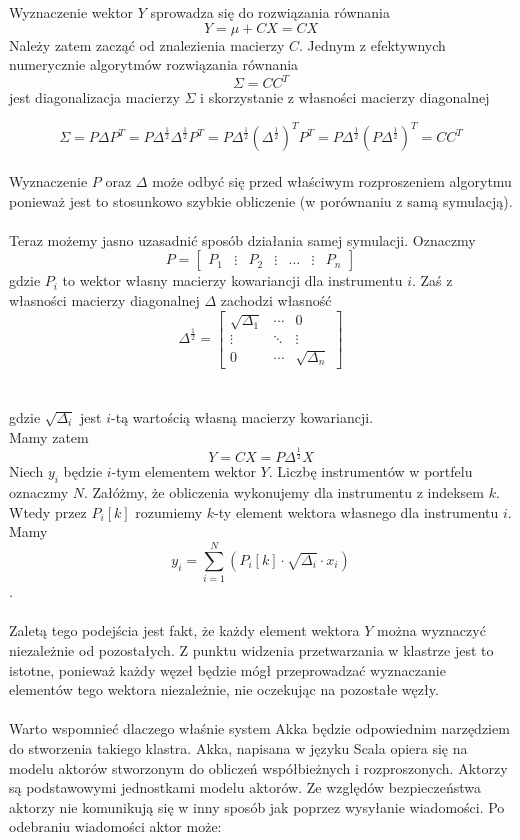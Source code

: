 \documentclass[11pt,titlepage]{article}
\numberwithin{equation}{section}
\begin{document}
Wyznaczenie wektor $Y$ sprowadza się do rozwiązania równania
$$Y = \mu + CX = CX $$
Należy zatem zacząć od znalezienia macierzy $C$. Jednym z efektywnych numerycznie algorytmów rozwiązania równania
$$\Sigma = CC^T $$
jest diagonalizacja macierzy $\Sigma$ i skorzystanie z własności macierzy diagonalnej 

$$ \Sigma =  P \Delta P^T = P \Delta^{\frac{1}{2}} \Delta^{\frac{1}{2}}P^T=P \Delta^{\frac{1}{2}} (\Delta^{\frac{1}{2}})^T P^T=P \Delta^{\frac{1}{2}} (P \Delta^{\frac{1}{2}})^T=CC^T $$\\

Wyznaczenie $P$ oraz $\Delta$ może odbyć się przed właściwym rozproszeniem algorytmu ponieważ jest to stosunkowo szybkie obliczenie (w porównaniu z samą symulacją).\\
\\
Teraz możemy jasno uzasadnić sposób działania samej symulacji. Oznaczmy 
$$ P=\begin{bmatrix} P_1 & \vdots & P_2 & \vdots  & \hdots & \vdots & P_n \end{bmatrix} $$
gdzie $P_i$ to wektor własny macierzy kowariancji dla instrumentu $i$. Zaś z własności macierzy diagonalnej $\Delta$ zachodzi własność
$$\Delta^{\frac{1}{2}}=\begin{bmatrix} \sqrt{\Delta_1} &  \cdots &0 \\  \vdots & \ddots  & \vdots \\ 0& \cdots & \sqrt{\Delta_n} \end{bmatrix}$$\\
\\
gdzie $\sqrt{\Delta_i}$ jest $i$-tą wartością własną macierzy kowariancji.\\
Mamy zatem 
$$Y = CX = P \Delta ^ {\frac{1}{2}} X$$
Niech $y_i$ będzie $i$-tym elementem wektor $Y$. Liczbę instrumentów w portfelu oznaczmy $N$. Załóżmy, że obliczenia wykonujemy dla instrumentu z indeksem $k$.\\
Wtedy przez $P_i[k]$ rozumiemy $k$-ty element wektora własnego dla instrumentu $i$. Mamy
$$y_i=\sum_{i=1}^{N}(P_i[k]\cdot\sqrt{\Delta_i}\cdot x_i)$$.\\
\\
Zaletą tego podejścia jest fakt, że każdy element wektora $Y$ można wyznaczyć niezależnie od pozostałych. Z punktu widzenia przetwarzania w klastrze jest to istotne, ponieważ każdy węzeł będzie mógł przeprowadzać wyznaczanie elementów tego wektora niezależnie, nie oczekując na pozostałe węzły.\\
\\
Warto wspomnieć dlaczego właśnie system Akka będzie odpowiednim narzędziem do stworzenia takiego klastra. Akka, napisana w języku Scala opiera się na modelu aktorów stworzonym do obliczeń współbieżnych i rozproszonych. Aktorzy są podstawowymi jednostkami modelu aktorów. Ze względów bezpieczeństwa aktorzy nie komunikują się w inny sposób jak poprzez wysyłanie wiadomości. Po odebraniu wiadomości aktor może:
\end{document}
